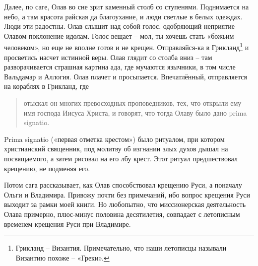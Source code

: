 Далее, по саге, Олав во сне зрит каменный столб со ступенями. Поднимается на небо, а там красота райская да благоухание, и люди светлые в белых одеждах. Люди эти радостны. Олав слышит над собой голос, одобряющий неприятие Олавом поклонение идолам. Голос вещает – мол, ты хочешь стать «божьим человеком», но еще не вполне готов и не крещен. Отправляйся-ка в Грикланд\footnote{Грикланд – Византия. Примечательно, что наши летописцы называли Византию похоже – «Греки».} и просветись насчет истинной веры. Олав глядит со столба вниз – там разворачивается страшная картина ада, где мучаются язычники, в том числе Вальдамар и Аллогия. Олав плачет и просыпается. Впечатлённый, отправляется на кораблях в Грикланд, где  

\begin{quotation}
отыскал он многих превосходных проповедников, тех, что открыли ему имя господа Иисуса Христа, и говорят, что тогда Олаву было дано prima signatio. 
\end{quotation}

Prima signatio («первая отметка крестом») было ритуалом, при котором христианский священник, под молитву об изгнании злых духов дышал на посвящаемого, а затем рисовал на его лбу крест. Этот ритуал предшествовал крещению, не подменяя его.

Потом сага рассказывает, как Олав способствовал крещению Руси, а поначалу Ольги и Владимира. Привожу почти без примечаний, ибо вопрос крещения Руси выходит за рамки моей книги. Но любопытно, что миссионерская деятельность Олава примерно, плюс-минус половина десятилетия, совпадает с летописным временем крещения Руси при Владимире.

